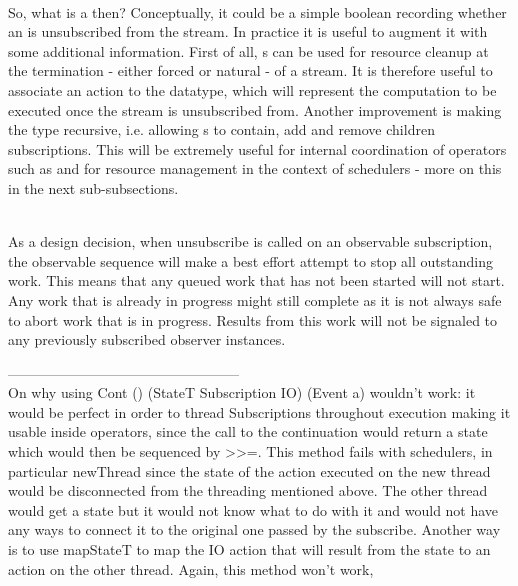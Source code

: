 \\
 

So, what is a  then? Conceptually, it could be a simple boolean recording whether an  is unsubscribed from the stream. In practice it is useful to augment it with some additional information. First of all, s can be used for resource cleanup at the termination - either forced or natural - of a stream. It is therefore useful to associate an  action to the datatype, which will represent the computation to be executed once the stream is unsubscribed from. Another improvement is making the type recursive, i.e. allowing s to contain, add and remove children subscriptions. This will be extremely useful for internal coordination of operators such as \code{(>>=)} and for resource management in the context of schedulers - more on this in the next sub-subsections.



\\


As a design decision, when unsubscribe is called on an observable subscription, the observable sequence will make a best effort attempt to stop all outstanding work. This means that any queued work that has not been started will not start. Any work that is already in progress might still complete as it is not always safe to abort work that is in progress. Results from this work will not be signaled to any previously subscribed observer instances.


--------------------------------------------------\\
On why using Cont () (StateT Subscription IO) (Event a) wouldn't work: it would be perfect in order to thread Subscriptions throughout execution making it usable inside operators, since the call to the continuation would return a state which would then be sequenced by >>=. This method fails with schedulers, in particular newThread since the state of the action executed on the new thread would be disconnected from the threading mentioned above. The other thread would get a state but it would not know what to do with it and would not have any ways to connect it to the original one passed by the subscribe. Another way is to use mapStateT to map the IO action that will result from the state to an action on the other thread. Again, this method won't work, 

